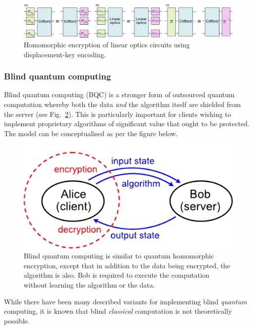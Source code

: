 \begin{figure}[!htb]
	\centering
	\includegraphics[width=\columnwidth]{figures/LO_QHE}
	\caption{Homomorphic encryption of linear optics circuits using displacement-key encoding.} \label{fig:QHE_LO}
\end{figure}

\subsubsection{Blind quantum computing} \label{blind-quantum-computing}

Blind quantum computing (BQC) is a stronger form of outsourced quantum computation whereby both the data \emph{and} the algorithm itself are shielded from the server \cite{bib:FitzsimonsBQC} (see Fig.~\ref{fig:blind_model}). This is particularly important for clients wishing to implement proprietary algorithms of significant value that ought to be protected. The model can be conceptualised as per the figure below.

\begin{figure}[!htb]
	\centering
	\includegraphics[width=\columnwidth]{figures/BQC}
	\caption{Blind quantum computing is similar to quantum homomorphic encryption, except that in addition to the data being encrypted, the algorithm is also. Bob is required to execute the computation without learning the algorithm or the data.} \label{fig:blind_model}
\end{figure}

While there have been many described variants for implementing blind \emph{quantum} computing, it is known that blind \emph{classical} computation is not theoretically possible.

